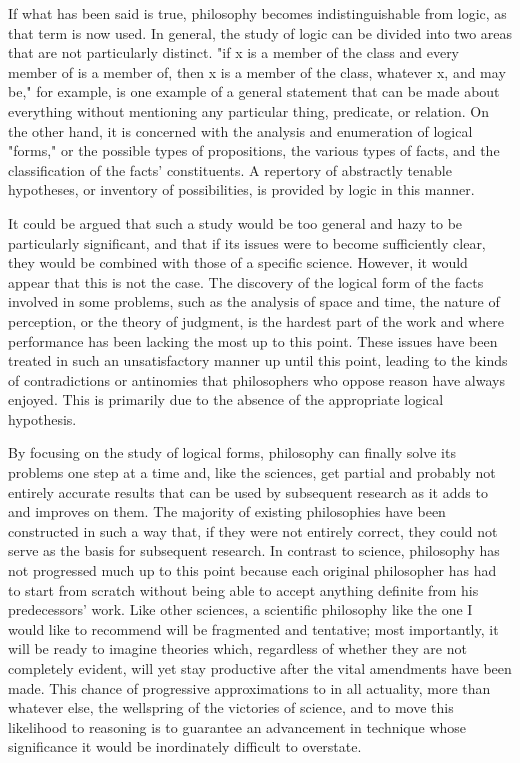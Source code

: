 \documentclass[a4paper,12pt]{book}[2004/02/16]
\theoremstyle{ilemma}
\theoremstyle{itheorem}
\theoremstyle{iother}
\theoremstyle{icorollary}
\theoremstyle{numcorollary}
\theoremstyle{idefinition}
\begin{document}
If what has been said is true, philosophy becomes indistinguishable from logic, as that term is now used. In general, the study of logic can be divided into two areas that are not particularly distinct. "if x is a member of the class  and every member of  is a member of, then x is a member of the class, whatever x, and may be," for example, is one example of a general statement that can be made about everything without mentioning any particular thing, predicate, or relation. On the other hand, it is concerned with the analysis and enumeration of logical "forms," or the possible types of propositions, the various types of facts, and the classification of the facts' constituents. A repertory of abstractly tenable hypotheses, or inventory of possibilities, is provided by logic in this manner.

It could be argued that such a study would be too general and hazy to be particularly significant, and that if its issues were to become sufficiently clear, they would be combined with those of a specific science. However, it would appear that this is not the case. The discovery of the logical form of the facts involved in some problems, such as the analysis of space and time, the nature of perception, or the theory of judgment, is the hardest part of the work and where performance has been lacking the most up to this point. These issues have been treated in such an unsatisfactory manner up until this point, leading to the kinds of contradictions or antinomies that philosophers who oppose reason have always enjoyed. This is primarily due to the absence of the appropriate logical hypothesis.

By focusing on the study of logical forms, philosophy can finally solve its problems one step at a time and, like the sciences, get partial and probably not entirely accurate results that can be used by subsequent research as it adds to and improves on them. The majority of existing philosophies have been constructed in such a way that, if they were not entirely correct, they could not serve as the basis for subsequent research. In contrast to science, philosophy has not progressed much up to this point because each original philosopher has had to start from scratch without being able to accept anything definite from his predecessors' work. Like other sciences, a scientific philosophy like the one I would like to recommend will be fragmented and tentative; most importantly, it will be
ready to imagine theories which, regardless of whether they are not completely evident,
will yet stay productive after the vital amendments have been
made. This chance of progressive approximations to in all actuality,
more than whatever else, the wellspring of the victories of science, and to
move this likelihood to reasoning is to guarantee an advancement in
technique whose significance it would be inordinately difficult to overstate.
\end{document}
